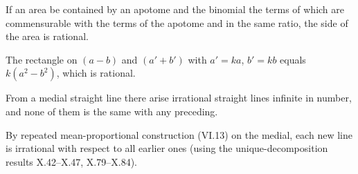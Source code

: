 \begin{claim}
\label{prop:X.114}
If an area be contained by an apotome and the binomial the terms of
which are commensurable with the terms of the apotome and in the
same ratio, the side of the area is rational.
\end{claim}
\begin{evidence}[Proof of X.114]
\label{ev:X.114}
The rectangle on $(a - b)$ and $(a' + b')$ with $a' = ka$, $b' = kb$
equals $k(a^2 - b^2)$, which is rational.
\end{evidence}

\begin{claim}
\label{prop:X.115}
From a medial straight line there arise irrational straight lines
infinite in number, and none of them is the same with any preceding.
\end{claim}
\begin{evidence}[Proof of X.115]
\label{ev:X.115}
By repeated mean-proportional construction (VI.13) on the medial,
each new line is irrational with respect to all earlier ones (using
the unique-decomposition results X.42--X.47, X.79--X.84).
\end{evidence}
